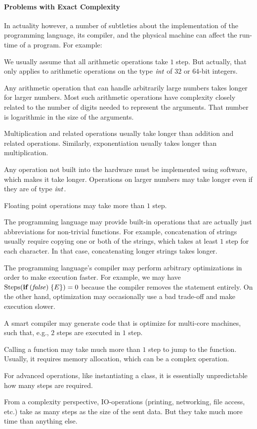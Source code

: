 \paragraph{Problems with Exact Complexity}
In actuality however, a number of subtleties about the implementation of the programming language, its compiler, and the physical machine can affect the run-time of a program.
For example:
\begin{compactitem}
 \item We usually assume that all arithmetic operations take $1$ step.
   But actually, that only applies to arithmetic operations on the type $\mathit{int}$ of $32$ or $64$-bit integers.
  \begin{compactitem}
    \item Any arithmetic operation that can handle arbitrarily large numbers takes longer for larger numbers.
     Most such arithmetic operations have complexity closely related to the number of digits needed to represent the arguments.
     That number is logarithmic in the size of the arguments.
    \item Multiplication and related operations usually take longer than addition and related operations.
    Similarly, exponentiation usually takes longer than multiplication.
    \item Any operation not built into the hardware must be implemented using software, which makes it take longer.
     Operations on larger numbers may take longer even if they are of type $\mathit{int}$.
  \end{compactitem} 
 \item Floating point operations may take more than $1$ step.
 \item The programming language may provide built-in operations that are actually just abbreviations for non-trivial functions.
  For example, concatenation of strings usually require copying one or both of the strings, which takes at least $1$ step for each character.
  In that case, concatenating longer strings takes longer.
 \item The programming language's compiler may perform arbitrary optimizations in order to make execution faster.
  For example, we may have $\compl(\aifI{\false}{E})=0$ because the compiler removes the statement entirely.
  On the other hand, optimization may occasionally use a bad trade-off and make execution slower.
 \item A smart compiler may generate code that is optimize for multi-core machines, such that, e.g., $2$ steps are executed in $1$ step.
 \item Calling a function may take much more than $1$ step to jump to the function.
  Usually, it requires memory allocation, which can be a complex operation.
 \item For advanced operations, like instantiating a class, it is essentially unpredictable how many steps are required.
 \item From a complexity perspective, IO-operations (printing, networking, file access, etc.) take as many steps as the size of the sent data.
 But they take much more time than anything else.
\end{compactitem}

